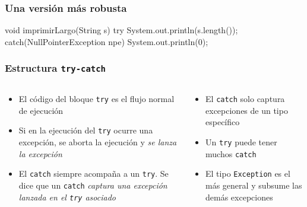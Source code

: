 \documentclass{beamer}
\newcommand{\code}[1]{\texttt{#1}}
\newcommand{\codet}[1]{\texttt{#1}}
\begin{document}
\begin{frame}[fragile]
  \frametitle{Una versión más robusta}

\begin{jsmall}
void imprimirLargo(String s) {
    try {
      System.out.println(s.length());
    } catch(NullPointerException npe) {
      System.out.println(0);
    }
}
\end{jsmall}

  
\end{frame}

\begin{frame}[fragile]
  \frametitle{Estructura \codet{try-catch}}
  \begin{columns}
    \begin{column}{0.5\textwidth}
      \begin{footnotesize}
      \begin{itemize}
        
      \item El código del bloque \code{try} es el flujo normal
        de ejecución
        
      \item Si en la ejecución del \code{try} ocurre una excepción, se
        aborta la ejecución y \emph{se lanza la excepción}
        
      \item El \code{catch} siempre acompaña a un \code{try}. Se dice
        que un \code{catch} \emph{captura una excepción lanzada en el
          \code{try} asociado}       
      \end{itemize}
      \end{footnotesize}
    \end{column}
    \begin{column}{0.5\textwidth}
      \begin{footnotesize}
      \begin{itemize}    
      \item El \code{catch} solo captura excepciones de un tipo
        específico
        
      \item Un \code{try} puede tener muchos \code{catch}
        
      \item El tipo \code{Exception} es el más general y subsume las
        demás excepciones        
      \end{itemize}
      \end{footnotesize}     
    \end{column}
  \end{columns}
  
\end{frame}
\end{document}
